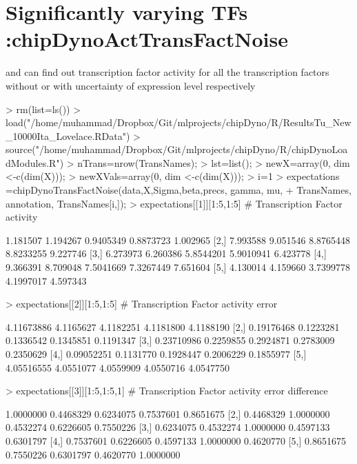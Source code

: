 \documentclass{article}
\begin{document}
\section{Significantly varying TFs :chipDynoActTransFactNoise}
 and  can find out transcription factor activity for all the transcription factors without or with uncertainty of expression level respectively 



\begin{Schunk}
\begin{Sinput}
> rm(list=ls())
> load("/home/muhammad/Dropbox/Git/mlprojects/chipDyno/R/ResultsTu_New_10000Ita_Lovelace.RData")
> source("/home/muhammad/Dropbox/Git/mlprojects/chipDyno/R/chipDynoLoadModules.R")
> nTrans=nrow(TransNames);
> lst=list();
> newX=array(0, dim <-c(dim(X)));
> newXVals=array(0, dim <-c(dim(X)));
> i=1
> expectations =chipDynoTransFactNoise(data,X,Sigma,beta,precs, gamma, mu, 
+   					TransNames, annotation, TransNames[i,]);
> expectations[[1]][1:5,1:5] # Transcription Factor activity
\end{Sinput}
\begin{Soutput}
         [,1]     [,2]      [,3]      [,4]     [,5]
[1,] 1.181507 1.194267 0.9405349 0.8873723 1.002965
[2,] 7.993588 9.051546 8.8765448 8.8233255 9.227746
[3,] 6.273973 6.260386 5.8544201 5.9010941 6.423778
[4,] 9.366391 8.709048 7.5041669 7.3267449 7.651604
[5,] 4.130014 4.159660 3.7399778 4.1997017 4.597343
\end{Soutput}
\begin{Sinput}
> expectations[[2]][1:5,1:5] # Transcription Factor activity error
\end{Sinput}
\begin{Soutput}
           [,1]      [,2]      [,3]      [,4]      [,5]
[1,] 4.11673886 4.1165627 4.1182251 4.1181800 4.1188190
[2,] 0.19176468 0.1223281 0.1336542 0.1345851 0.1191347
[3,] 0.23710986 0.2259855 0.2924871 0.2783009 0.2350629
[4,] 0.09052251 0.1131770 0.1928447 0.2006229 0.1855977
[5,] 4.05516555 4.0551077 4.0559909 4.0550716 4.0547750
\end{Soutput}
\begin{Sinput}
> expectations[[3]][1:5,1:5,1] # Transcription Factor activity error difference
\end{Sinput}
\begin{Soutput}
          [,1]      [,2]      [,3]      [,4]      [,5]
[1,] 1.0000000 0.4468329 0.6234075 0.7537601 0.8651675
[2,] 0.4468329 1.0000000 0.4532274 0.6226605 0.7550226
[3,] 0.6234075 0.4532274 1.0000000 0.4597133 0.6301797
[4,] 0.7537601 0.6226605 0.4597133 1.0000000 0.4620770
[5,] 0.8651675 0.7550226 0.6301797 0.4620770 1.0000000
\end{Soutput}
\end{Schunk}
\end{document}
